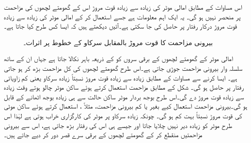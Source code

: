 اس مساوات کے مطابق امالی موٹر کی زیادہ سے زیادہ قوت مروڑ اس کے گھومتے لچھوں کی  مزاحمت پر منحصر نہیں ہو گی۔ یہ ایک اہم معلومات ہے جسے استعمال کر کے امالی موٹر کی زیادہ سے زیادہ قوت مروڑ درکار رفتار پر  حاصل کی جا سکتی ہے۔آئیں دیکھتے ہیں کہ ایسا کس طرح کیا جاتا ہے۔
\begin{figure}
\centering
%
\caption{بیرونی مزاحمت  کا قوت مروڑ بالمقابل سرکاو کے خطوط پر اثرات۔}
\label{شکل_امالی_بیرونی_مزاحمت_اور_مروٹ}
\end{figure}

امالی موٹر کے گھومتے لچھوں کے برقی سروں کو  کے ذریعہ باہر نکالا جاتا ہے جہاں ان کے ساتھ سلسلہ وار بیرونی مزاحمت جوڑی جاتی ہے۔اس طرح گھومتے لچھوں کی کل مزاحمت بڑھ کر  ہو جاتی ہے۔ ایسا کرنے سے مساوات   کے مطابق زیادہ سے زیادہ قوت مروڑ نسبتاً زیادہ سرکاو یعنی کم زاویائی رفتار پر حاصل ہو گی۔ شکل  کے مطابق مزاحمت  استعمال کرتے ہوئے ساکن موٹر چالو ہوتے  وقت زیادہ سے زیادہ قوت مروڑ دے گی۔اس طرح بوجھ بردار موٹر ساکن حالت سے ہی زیادہ بوجھ اٹھانے کے قابل ہو گی۔بیرونی مزاحمت استعمال کیے بغیر یا کم بیرونی مزاحمت، مثلاً ، استعمال کرتے ہوئے ساکن موٹی کی قوت مروڑ نسبتاً بہت کم ہو گی۔  چونکہ زیادہ سرکاو پر موٹر کی کارگزاری خراب ہوتی ہے لہٰذا اس طرح موٹر کو زیادہ دیر نہیں چلایا جاتا اور جیسے ہی اس کی رفتار بڑھ جاتی ہے، اس سے  بیرونی مزاحمتیں منقطع کر کے گھومتے لچھوں کے برقی سرے قصر دور کر دیے جاتے ہیں۔


